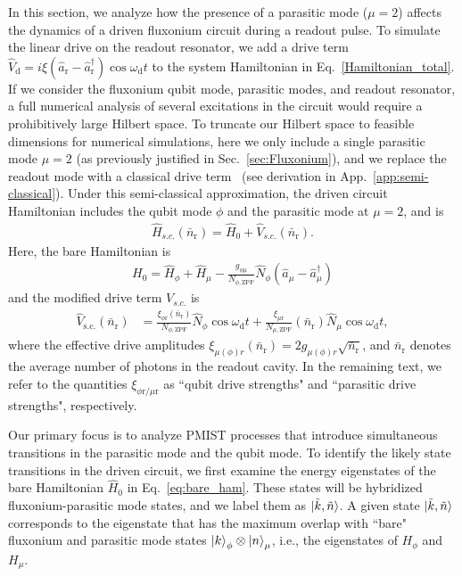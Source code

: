 \documentclass[%
reprint,
superscriptaddress,
 amsmath,amssymb,
 aps,
 prx,
longbibliography,
floatfix,
]{revtex4-2}
\begin{document}
In this section, we analyze how the presence of a parasitic mode ($\mu=2$) affects the dynamics of a driven fluxonium circuit during a readout pulse. To simulate the linear drive on the readout resonator, we add a drive term $\hat{V}_\textrm{d}=i\xi (\hat a_\textrm{r}-\hat a_\textrm{r}^\dagger)\cos{\omega_\textrm{d} t}$ to the system Hamiltonian in Eq.~\ref{Hamiltonian_total}. If we consider the fluxonium qubit mode, parasitic modes, and readout resonator, a full numerical analysis of several excitations in the circuit would require a prohibitively large Hilbert space. To truncate our Hilbert space to feasible dimensions for numerical simulations, here we only include a single parasitic mode $\mu=2$ (as previously justified in Sec.~\ref{sec:Fluxonium}), and we replace the readout mode with a classical drive term~\cite{cohen2023reminiscence,dumas2024unified,xiao2023diagrammatic} (see derivation in App.~\ref{app:semi-classical}). Under this semi-classical approximation, the driven circuit Hamiltonian includes the qubit mode $\phi$ and the parasitic mode at $\mu=2$, and is
\begin{align}
  \hat H_{s.c.}(\bar n_\textrm{r})=\hat H_0+\hat V_{s.c.}(\bar n_\textrm{r}).  \label{eq:drive_Ham}
\end{align}
Here, the bare Hamiltonian is
\begin{align}
H_0=\hat H_\phi+\hat H_{\mu}-\frac{g_{\phi\mu}}{N_{\phi,\mathrm{ZPF}}} \hat N_\phi (\hat a_{\mu}-\hat a_{\mu}^\dagger) \label{eq:bare_ham} 
\end{align}
and the modified drive term $V_{s.c.}$ is
\begin{align}
    \hat V_\textrm{s.c.}(\bar n_\textrm{r})&=\frac{\xi_{\phi \textrm{r}}(\bar n_\textrm{r})}{N_{\phi,\mathrm{ZPF}}} \hat N_\phi\cos{\omega_\textrm{d} t}+\frac{\xi_{\mu \textrm{r}}}{N_{\mu, \mathrm{ZPF}}}(\bar n_\textrm{r}) \hat N_\mu\cos{\omega_\textrm{d} t}\label{eq:drive},
\end{align}
where the effective drive amplitudes $\xi_{\mu(\phi) r}(\bar n_\textrm{r})=2g_{\mu(\phi) r}\sqrt{\bar n_\textrm{r}}$, and $\bar n_\textrm{r}$ denotes the average number of photons in the readout cavity. In the remaining text, we refer to the quantities $\xi_{\phi \textrm{r}/\mu \textrm{r}}$ as  ``qubit drive strengths" and ``parasitic drive strengths", respectively. 

Our primary focus is to analyze PMIST processes that introduce simultaneous transitions in the parasitic mode and the qubit mode. To identify the likely state transitions in the driven circuit, we first examine the energy eigenstates of the bare Hamiltonian $\hat{H}_0$ in Eq.~\ref{eq:bare_ham}. These states will be hybridized fluxonium-parasitic mode states, and we label them as $\ket{\tilde{k}, \tilde{n}}$.  A given state $\ket{\tilde{k}, \tilde{n}}$ corresponds to the eigenstate that has the maximum overlap with ``bare" fluxonium and parasitic mode states $\ket{k}_\phi\otimes\ket{n}_\mu$, i.e., the eigenstates of $H_{\phi}$ and $H_{\mu}$.
\end{document}
